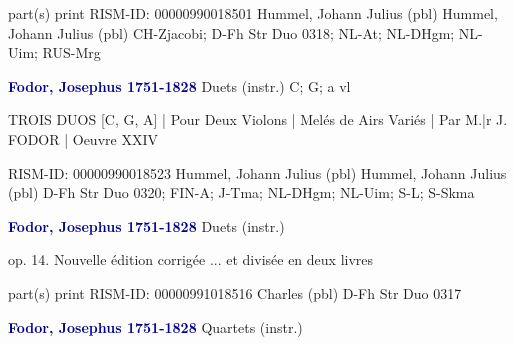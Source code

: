 \documentclass[twocolumn]{book}
\begin{document}
\newline \textcolor{darkblue}{}  part(s)  
\newline print
\newline RISM-ID: 00000990018501
\newline Hummel, Johann Julius  (pbl)
\newline Hummel, Johann Julius  (pbl)
\newline CH-Zjacobi; D-Fh  Str Duo 0318; NL-At; NL-DHgm; NL-Uim; RUS-Mrg
\newline \par \vspace{7pt} \textcolor{darkblue}{\textbf{Fodor, Josephus  1751-1828}}
\newline Duets (instr.)  C; G; a  
 vl
\newline \begin{itshape}TROIS DUOS [C, G, A] | Pour Deux Violons | Melés de Airs Variés | Par  M.|r J. FODOR | Oeuvre XXIV\end{itshape} 
\newline RISM-ID: 00000990018523
\newline Hummel, Johann Julius  (pbl)
\newline Hummel, Johann Julius  (pbl)
\newline D-Fh  Str Duo 0320; FIN-A; J-Tma; NL-DHgm; NL-Uim; S-L; S-Skma
\newline \par \vspace{7pt} \textcolor{darkblue}{\textbf{Fodor, Josephus  1751-1828}}
\newline Duets (instr.)    
\newline \begin{itshape}op. 14. Nouvelle édition corrigée ... et divisée en deux livres\end{itshape} 
\newline \textcolor{darkblue}{}  part(s)  
\newline print
\newline RISM-ID: 00000991018516
\newline Charles  (pbl)
\newline D-Fh  Str Duo 0317
\newline \par \vspace{7pt} \textcolor{darkblue}{\textbf{Fodor, Josephus  1751-1828}}
\newline Quartets (instr.)    
\end{document}
